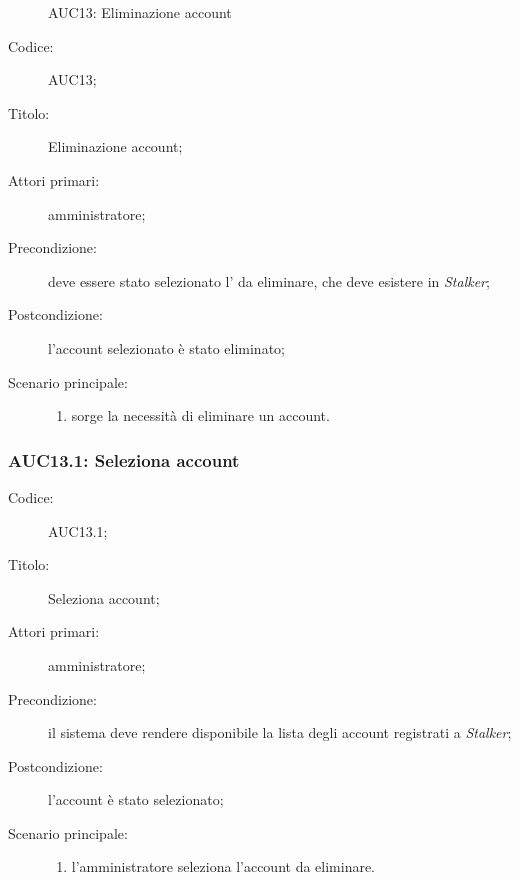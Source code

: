 \documentclass[../../../analisi-dei-requisiti.tex]{subfiles}
\begin{document}
\begin{figure}[H]
  \centering
  \caption{AUC13: Eliminazione account}%
  \label{fig:AUC13}
\end{figure}

\begin{description}
  \item[Codice:] AUC13;
  \item[Titolo:] Eliminazione account;
  \item[Attori primari:] amministratore;
  \item[Precondizione:] deve essere stato selezionato l' da eliminare, che deve esistere in \emph{Stalker};
  \item[Postcondizione:] l'account selezionato è stato eliminato;
  \item[Scenario principale:]
  \begin{enumerate}
    \item sorge la necessità di eliminare un account.
  \end{enumerate}
\end{description}

\subsubsection{AUC13.1: Seleziona account}%
\label{subs:AUC13.1}
\begin{description}
  \item[Codice:] AUC13.1;
  \item[Titolo:] Seleziona account;
  \item[Attori primari:] amministratore;
  \item[Precondizione:] il sistema deve rendere disponibile la lista degli account registrati a \emph{Stalker};
  \item[Postcondizione:] l'account è stato selezionato;
  \item[Scenario principale:]
  \begin{enumerate}
    \item l'amministratore seleziona l'account da eliminare.
  \end{enumerate}
\end{description}
\end{document}

